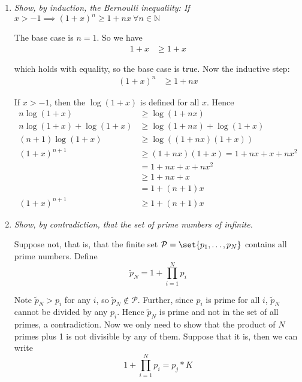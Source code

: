 \documentclass{article}
\begin{document}
\begin{enumerate}[1.]
  \item \textit{Show, by induction, the Bernoulli inequaliity: If $x > -1 \implies (1 + x)^n \ge 1 + nx ~ \forall n \in \mathbb{N}$}

    \solution The base case is $n = 1$. So we have
    \begin{align*}
        1 + x & \ge 1 + x
    \end{align*}

    which holds with equality, so the base case is true. Now the inductive step:
    \begin{align*}
        (1 + x)^n & \ge 1 + nx
    \end{align*}

    If $x > -1$, then the $\log(1 + x)$ is defined for all $x$. Hence
    \begin{align*}
        n \log(1 + x)               & \ge \log(1 + nx)                          \\
        n \log(1 + x) + \log(1 + x) & \ge \log(1 + nx) + \log(1 + x)            \\
        (n + 1) \log(1 + x)         & \ge \log((1 + nx)(1 + x))                 \\
        (1 + x)^{n + 1}             & \ge (1 + nx) (1 + x) =  1 + nx + x + nx^2 \\
                                    & =   1 + nx + x + nx^2                     \\
                                    & \ge 1 + nx + x                            \\
                                    & =   1 + (n + 1)x                          \\
        (1 + x)^{n + 1}             & \ge 1 + (n + 1)x
    \end{align*}

  \item \textit{Show, by contradiction, that the set of prime numbers of infinite.}

    \solution Suppose not, that is, that the finite set $\mathcal{P} =
      \set{p_1, \ldots, p_N}$ contains all prime numbers. Define
      \[
          \widetilde{p}_N = 1 + \prod_{i = 1}^N p_i
      \]

      Note $\widetilde{p}_N > p_i$ for any $i$, so $\widetilde{p}_N \notin \mathcal{P}$. Further, since $p_i$ is prime for all $i$, $\widetilde{p}_N$ cannot be divided by any $p_i$. Hence $\widetilde{p}_N$ is prime and not in the set of all primes, a contradiction. Now we only need to show that the product of $N$ primes plus 1 is not divisible by any of them. Suppose that it is, then we can write
      \[
          1 + \prod_{i = 1}^N p_i = p_j * K
      \]


\end{enumerate}
\end{document}
